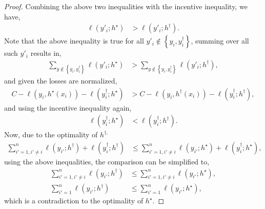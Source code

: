 \documentclass{article}
\begin{document}
\begin{proof}
Combining the above two inequalities with the incentive inequality, we have,
\begin{align*}
\ell\left(y'_{i} ; h^\star \right) &> \ell\left(y'_{i} ; h^{\dagger}\right).
\end{align*}
Note that the above inequality is true for all $y'_{i} \notin \left\{y_{i}, y^{\dagger}_{i}\right\}$, summing over all such $y'_{i}$ results in,
\begin{align*}
\displaystyle\sum_{y \notin \left\{y_{i}, y^{\dagger}_{i}\right\}} \ell\left(y'_{i} ; h^\star \right) &> \displaystyle\sum_{y \notin \left\{y_{i}, y^{\dagger}_{i}\right\}} \ell\left(y'_{i} ; h^{\dagger}\right),
\end{align*}
and given the losses are normalized,
\begin{align*}
C  - \ell\left(y_{i}, h^\star \left(x_{i}\right)\right) - \ell\left(y^{\dagger}_{i} ; h^\star \right) &> C  - \ell\left(y_{i},  h^{\dagger}\left(x_{i}\right)\right) - \ell\left(y^{\dagger}_{i} ; h^{\dagger}\right),
\end{align*}
and using the incentive inequality again,
\begin{align*}
\ell\left(y^{\dagger}_{i} ; h^\star \right) &< \ell\left(y^{\dagger}_{i} ; h^{\dagger}\right).
\end{align*}
Now, due to the optimality of $h^{\dagger,}$
\begin{align*}
\displaystyle\sum_{i'=1, i' \neq  i}^{n} \ell\left(y_{i'} ; h^{\dagger}\right) + \ell\left(y^{\dagger}_{i} ; h^{\dagger}\right) &\leq  \displaystyle\sum_{i'=1, i' \neq  i}^{n} \ell\left(y_{i'} ; h^\star \right) + \ell\left(y^{\dagger}_{i} ; h^\star \right),
\end{align*}
using the above inequalities, the comparison can be simplified to,
\begin{align*}
\displaystyle\sum_{i'=1, i' \neq  i}^{n} \ell\left(y_{i'} ; h^{\dagger}\right) &\leq  \displaystyle\sum_{i'=1, i' \neq  i}^{n} \ell\left(y_{i'} ; h^\star \right),
\\ \displaystyle\sum_{i'=1}^{n} \ell\left(y_{i'} ; h^{\dagger}\right) &\leq  \displaystyle\sum_{i'=1}^{n} \ell\left(y_{i'} ; h^\star \right),
\end{align*}
which is a contradiction to the optimality of $h^\star $.
\newline \newline\end{proof}


\end{document}
